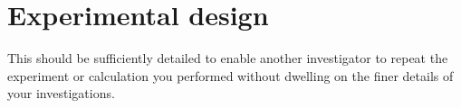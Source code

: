 \chapter{Experimental design} \label{chapter:Experiment}
This should be sufficiently detailed to enable another investigator to repeat the experiment or calculation you performed without dwelling on the finer details of your investigations.
